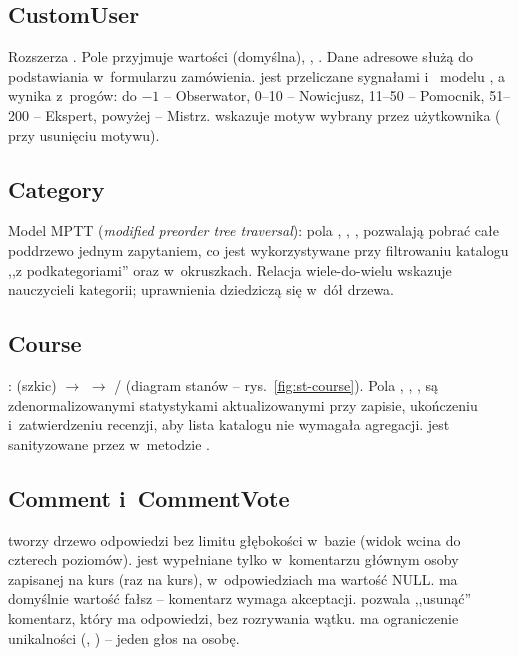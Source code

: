 \subsection{CustomUser}
Rozszerza . Pole  przyjmuje wartości 
(domyślna), , . Dane adresowe służą do podstawiania w~formularzu
zamówienia.  jest przeliczane sygnałami  i~
modelu , a~ wynika z~progów: do $-1$ -- Obserwator,
0--10 -- Nowicjusz, 11--50 -- Pomocnik, 51--200 -- Ekspert, powyżej -- Mistrz.
 wskazuje motyw wybrany przez użytkownika ( przy
usunięciu motywu).

\subsection{Category}
Model MPTT (\emph{modified preorder tree traversal}): pola , ,
,  pozwalają pobrać całe poddrzewo jednym zapytaniem, co jest
wykorzystywane przy filtrowaniu katalogu ,,z podkategoriami'' oraz w~okruszkach. Relacja
wiele-do-wielu  wskazuje nauczycieli kategorii; uprawnienia dziedziczą
się w~dół drzewa.

\subsection{Course}
:  (szkic) $\rightarrow$  $\rightarrow$
 /  (diagram stanów -- rys.~\ref{fig:st-course}). Pola
, , ,
 są zdenormalizowanymi statystykami aktualizowanymi przy zapisie,
ukończeniu i~zatwierdzeniu recenzji, aby lista katalogu nie wymagała agregacji.
 jest sanityzowane przez  w~metodzie .

\subsection{Comment i~CommentVote}
 tworzy drzewo odpowiedzi bez limitu głębokości w~bazie (widok wcina do
czterech poziomów).  jest wypełniane tylko w~komentarzu głównym osoby zapisanej
na kurs (raz na kurs), w~odpowiedziach ma wartość NULL.  ma domyślnie
wartość fałsz -- komentarz wymaga akceptacji.  pozwala ,,usunąć''
komentarz, który ma odpowiedzi, bez rozrywania wątku.  ma ograniczenie
unikalności (, ) -- jeden głos na osobę.

